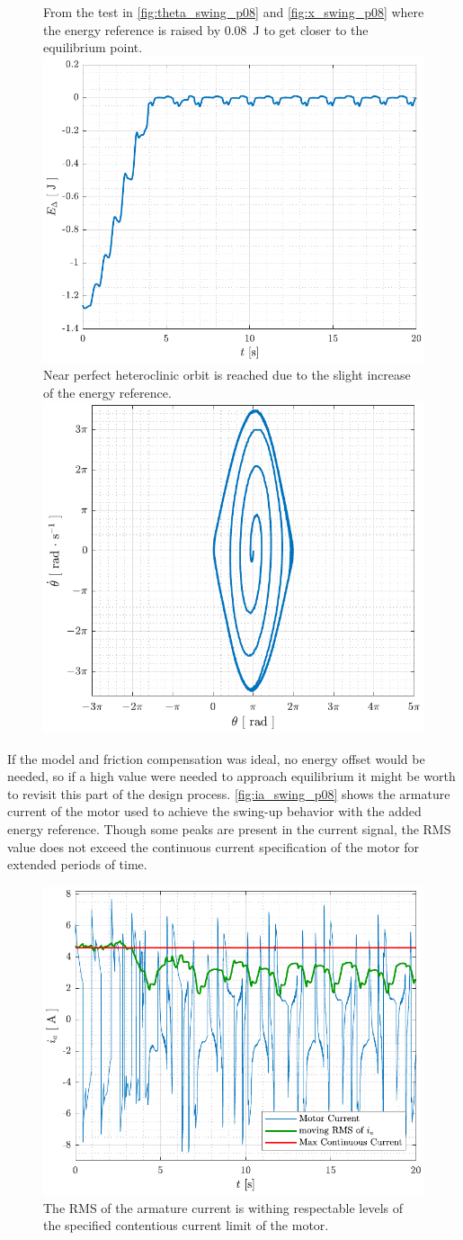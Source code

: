 \begin{figure}[H]
  \hspace{1cm}
  \captionbox
  {
    From the test in \autoref{fig:theta_swing_p08} and \ref{fig:x_swing_p08} where the energy reference is raised by \SI{0.08}{J} to get closer to the equilibrium point.
    \label{fig:Edelta_swing_p08}
  }
  {
    \hspace{-1cm}
    \includegraphics[width=.4\textwidth]{figures/Edelta_swing_p08}
  }
  \hspace{20pt}
  \captionbox 
  {
    Near perfect heteroclinic orbit is reached due to the slight increase of the energy reference.
    \label{fig:phase_swing_p08}
  }
  {
    \hspace{-1cm}
    \includegraphics[width=.364\textwidth]{figures/phase_swing_p08}
  }  
\end{figure}
If the model and friction compensation was ideal, no energy offset would be needed, so if a high value were needed to approach equilibrium it might be worth to revisit this part of the design process.
%
\autoref{fig:ia_swing_p08} shows the armature current of the motor used to achieve the swing-up behavior with the added energy reference. Though some peaks are present in the current signal, the RMS value does not exceed the continuous current specification of the motor for extended periods of time.
\begin{figure}[H]
  \includegraphics[width=.42\textwidth]{figures/ia_swing_p08}
  \caption{The RMS of the armature current is withing respectable levels of the specified contentious current limit of the motor.}
  \label{fig:ia_swing_p08}
\end{figure}
